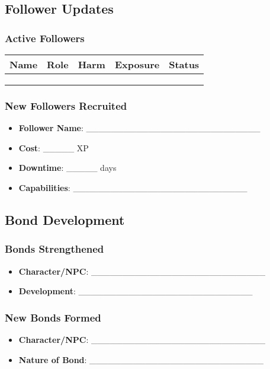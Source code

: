 \subsection{Follower Updates}

\subsubsection{Active Followers}
\begin{tabular}{|p{3cm}|p{2cm}|p{1.5cm}|p{1.5cm}|p{2cm}|}
\hline
\textbf{Name} & \textbf{Role} & \textbf{Harm} & \textbf{Exposure} & \textbf{Status} \\
\hline
& & & & \\
& & & & \\
& & & & \\
\hline
\end{tabular}

\subsubsection{New Followers Recruited}
\begin{itemize}
    \item \textbf{Follower Name}: \_\_\_\_\_\_\_\_\_\_\_\_\_\_\_\_\_\_\_\_\_\_\_\_\_\_\_\_
    \item \textbf{Cost}: \_\_\_\_\_ XP
    \item \textbf{Downtime}: \_\_\_\_\_ days
    \item \textbf{Capabilities}: \_\_\_\_\_\_\_\_\_\_\_\_\_\_\_\_\_\_\_\_\_\_\_\_\_\_\_\_
\end{itemize}

\subsection{Bond Development}

\subsubsection{Bonds Strengthened}
\begin{itemize}
    \item \textbf{Character/NPC}: \_\_\_\_\_\_\_\_\_\_\_\_\_\_\_\_\_\_\_\_\_\_\_\_\_\_\_\_
    \item \textbf{Development}: \_\_\_\_\_\_\_\_\_\_\_\_\_\_\_\_\_\_\_\_\_\_\_\_\_\_\_\_
\end{itemize}

\subsubsection{New Bonds Formed}
\begin{itemize}
    \item \textbf{Character/NPC}: \_\_\_\_\_\_\_\_\_\_\_\_\_\_\_\_\_\_\_\_\_\_\_\_\_\_\_\_
    \item \textbf{Nature of Bond}: \_\_\_\_\_\_\_\_\_\_\_\_\_\_\_\_\_\_\_\_\_\_\_\_\_\_\_\_
\end{itemize}

